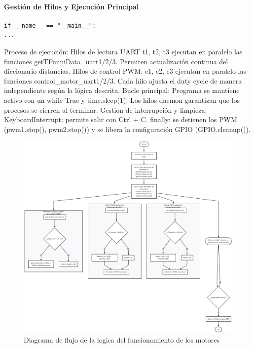 \documentclass[12pt,a4paper]{article}
\begin{document}
\paragraph{Gestión de Hilos y Ejecución Principal}
\begin{verbatim}
if __name__ == "__main__":
...
\end{verbatim}
Proceso de ejecución: Hilos de lectura UART t1, t2, t3 ejecutan en paralelo las funciones getTFminiData\_uart1/2/3. Permiten actualización continua del diccionario distancias. Hilos de control PWM: c1, c2, c3 ejecutan en paralelo las funciones control\_motor\_uart1/2/3. Cada hilo ajusta el duty cycle de manera independiente según la lógica descrita. Bucle principal: Programa se mantiene activo con un while True y time.sleep(1). Los hilos daemon garantizan que los procesos se cierren al terminar. Gestion de interrupción y limpieza: KeyboardInterrupt: permite salir con Ctrl + C. finally: se detienen los PWM (pwm1.stop(), pwm2.stop()) y se libera la configuración GPIO (GPIO.cleanup()).

\begin{figure}[H]
\noindent\hspace*{-0.7in}%
\includegraphics[width=1.2\linewidth,height=1.1\linewidth]{Carpeta tecnica/diagrama de flujo PWM.png}
\caption{Diagrama de flujo de la logica del funcionamiento de los motores}
\end{figure}
\end{document}
